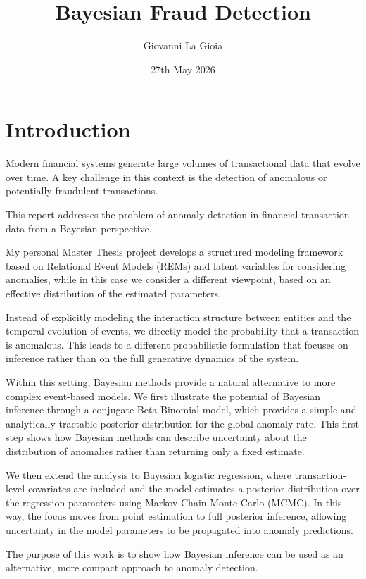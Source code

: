 \documentclass[a4paper,12pt]{article}
\title{Bayesian Fraud Detection}
\author{Giovanni La Gioia}
\date{27th May 2026}
\begin{document}
\maketitle

\section{Introduction}
Modern financial systems generate large volumes of transactional data that evolve over time.
A key challenge in this context is the detection of anomalous or potentially fraudulent transactions.

This report addresses the problem of anomaly detection in financial transaction data from a Bayesian perspective.

My personal Master Thesis project develops a structured modeling framework based on Relational Event Models (REMs) and latent variables for considering anomalies, while in this case we consider a different viewpoint, based on an effective distribution of the estimated parameters.

Instead of explicitly modeling the interaction structure between entities and the temporal evolution of events, we directly model the probability that a transaction is anomalous.
This leads to a different probabilistic formulation that focuses on inference rather than on the full generative dynamics of the system.

Within this setting, Bayesian methods provide a natural alternative to more complex event-based models.
We first illustrate the potential of Bayesian inference through a conjugate Beta-Binomial model, which provides a simple and analytically tractable posterior distribution for the global anomaly rate.
This first step shows how Bayesian methods can describe uncertainty about the distribution of anomalies rather than returning only a fixed estimate.

We then extend the analysis to Bayesian logistic regression, where transaction-level covariates are included and the model estimates a posterior distribution over the regression parameters using Markov Chain Monte Carlo (MCMC).
In this way, the focus moves from point estimation to full posterior inference, allowing uncertainty in the model parameters to be propagated into anomaly predictions.

The purpose of this work is to show how Bayesian inference can be used as an alternative, more compact approach to anomaly detection.
\end{document}
